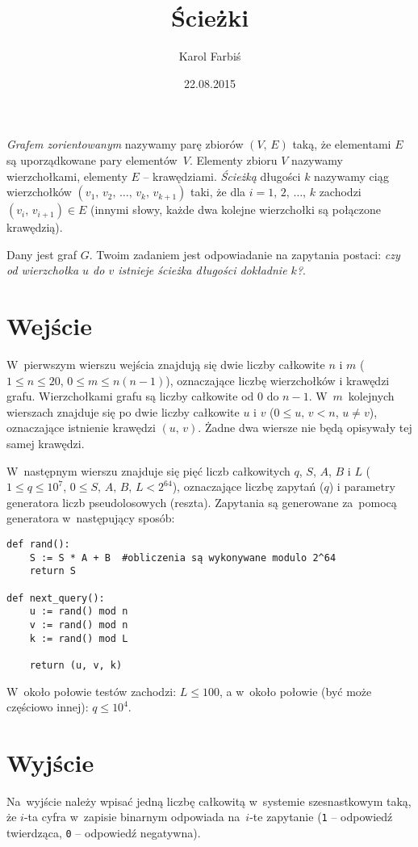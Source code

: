 \documentclass[zad,zawodnik,utf8]{sinol}
\title{Ścieżki}
\author{Karol Farbiś}
\date{22.08.2015}
\begin{document}
\begin{tasktext}%
	\emph{Grafem zorientowanym} nazywamy parę zbiorów $\left(V,\, E\right)$ taką, że elementami $E$ są
	uporządkowane pary elementów~$V$. Elementy zbioru $V$ nazywamy wierzchołkami,
	elementy $E$ -- krawędziami. \emph{Ścieżką} długości $k$ nazywamy ciąg wierzchołków $\left(v_1,\, v_2,\, \ldots
	,\, v_k,\, v_{k+1}\right)$ taki, że dla $i=1,\, 2,\, \ldots,\, k$ zachodzi $\left(v_i,\, v_{i+1}\right)\in E$
	(innymi słowy, każde dwa kolejne wierzchołki są połączone krawędzią).

	Dany jest graf $G$. Twoim zadaniem jest odpowiadanie na zapytania postaci: \textit{czy od wierzchołka $u$ do $v$
	istnieje ścieżka długości dokładnie $k$?}.

\section{Wejście}
	W~pierwszym wierszu wejścia znajdują się dwie liczby całkowite $n$ i $m$ ($1\leq n\leq 20$, $0\leq m\leq n(n-1)$),
	oznaczające liczbę wierzchołków i krawędzi grafu. Wierzchołkami grafu są liczby całkowite od $0$ do $n-1$.
	W~$m$~kolejnych wierszach znajduje się po dwie liczby całkowite $u$ i $v$
	($0\leq u,\, v < n$, $u\neq v$), oznaczające istnienie krawędzi
	$\left(u,\, v\right)$. Żadne dwa wiersze nie będą opisywały tej samej krawędzi.

	W~następnym wierszu znajduje się pięć liczb całkowitych $q$, $S$, $A$, $B$ i $L$ ($1\leq q\leq 10^7$, $0\leq S,\, A,\, B,\, L < 2^{64}$),
	oznaczające liczbę zapytań ($q$) i parametry generatora liczb pseudolosowych (reszta). Zapytania są generowane za~pomocą
	generatora w~następujący sposób:
	\vspace{-2ex}
	\begin{verbatim}
def rand():
    S := S * A + B  #obliczenia są wykonywane modulo 2^64
    return S

def next_query():
    u := rand() mod n
    v := rand() mod n
    k := rand() mod L

    return (u, v, k)
	\end{verbatim}
	\vspace{-2ex}

	W~około połowie testów zachodzi: $L \leq 100$, a w~około połowie (być może częściowo innej): $q\leq 10^4$.

\section{Wyjście}
	Na~wyjście należy wpisać jedną liczbę całkowitą w~systemie szesnastkowym taką, że $i$-ta cyfra w~zapisie binarnym
	odpowiada na~$i$-te zapytanie (\texttt{1} -- odpowiedź twierdząca, \texttt{0} -- odpowiedź negatywna).


\end{tasktext}
\end{document}
